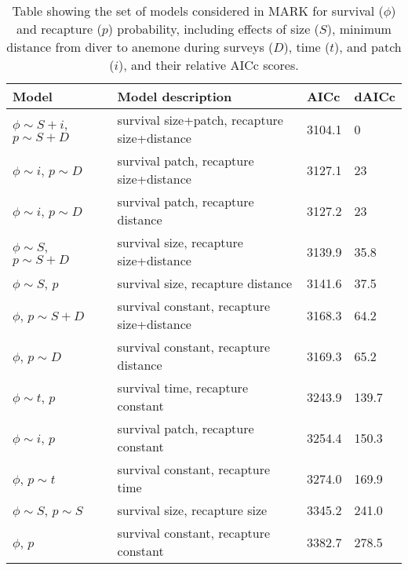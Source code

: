 \documentclass[12pt, oneside]{article}   	%
\begin{document}
\begin{table}[!htbp]
\begin{centering}
\caption{Table showing the set of models considered in MARK for survival ($\phi$) and recapture ($p$) probability, including effects of size ($S$), minimum distance from diver to anemone during surveys ($D$), time ($t$), and patch ($i$), and their relative AICc scores.}\label{APP_TAB_MARKmodels}
\begin{tabular}{|p{2in}|p{2.5in}|p{0.75in}|p{0.75in}|}
\hline 
\textbf{Model} & \textbf{Model description} & \textbf{AICc} & \textbf{dAICc} \\ \hline
$\phi \sim S+i$, $p \sim S+D$ & survival size+patch, recapture size+distance & 3104.1 & 0 \\ \hline
$\phi \sim i$, $p \sim D$ & survival patch, recapture size+distance & 3127.1 & 23 \\ \hline
$\phi \sim i$, $p \sim D$ & survival patch, recapture distance & 3127.2 & 23 \\ \hline
$\phi \sim S$, $p \sim S+D$ & survival size, recapture size+distance & 3139.9 & 35.8 \\ \hline
$\phi \sim S$, $p$ & survival size, recapture distance & 3141.6 & 37.5 \\ \hline
$\phi$, $p \sim S+D$ & survival constant, recapture size+distance & 3168.3 & 64.2 \\ \hline
$\phi$, $p \sim D$ & survival constant, recapture distance & 3169.3 & 65.2 \\ \hline
$\phi \sim t$, $p$ & survival time, recapture constant & 3243.9 & 139.7 \\ \hline
$\phi \sim i$, $p$ & survival patch, recapture constant & 3254.4 & 150.3 \\ \hline
$\phi$, $p \sim t$ & survival constant, recapture time & 3274.0 & 169.9 \\ \hline
$\phi \sim S$, $p \sim S$ & survival size, recapture size & 3345.2 & 241.0 \\ \hline
$\phi$, $p$ & survival constant, recapture constant & 3382.7 & 278.5 \\ \hline
\end{tabular}
\end{centering}
\end{table}
\end{document}
